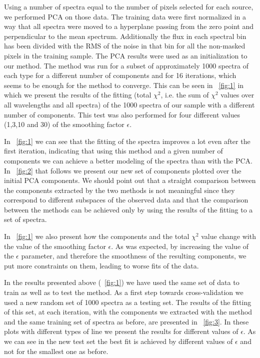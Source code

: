 \documentclass[12pt,preprint]{aastex}
\begin{document}
Using a number of spectra equal to the number of pixels selected for
each source, we performed PCA on those data. The training data were
first normalized in a way that all spectra were moved to a hyperplane
passing from the zero point and perpendicular to the mean
spectrum. Additionally the flux in each spectral bin has been divided
with the RMS of the noise in that bin for all the non-masked pixels in
the training sample. The PCA results were used as an initialization to
our method. The method was run for a subset of approximately 1000
spectra of each type for a different number of components and for 16
iterations, which seems to be enough for the method to converge. This
can be seen in \figurename~\ref{fig:1} in which we present the results of
the fitting (total $\chi^2$, i.e. the sum of $\chi^2$ values over all
wavelengths and all spectra) of the 1000 spectra of our sample with a
different number of components. This test was also performed for four
different values (1,3,10 and 30) of the smoothing factor $\epsilon$.

In \figurename~\ref{fig:1} we can see that the fitting of the spectra
improves a lot even after the first iteration, indicating that using
this method and a given number of components we can achieve a better
modeling of the spectra than with the PCA. In \figurename~\ref{fig:2}
that follows we present our new set of components plotted over the
initial PCA components. We should point out that a straight comparison
between the components extracted by the two methods is not meaningful
since they correspond to different subspaces of the observed data and
that the comparison between the methods can be achieved only by using
the results of the fitting to a set of spectra.

In \figurename~\ref{fig:1} we also present how the components and the
total $\chi^2$ value change with the value of the smoothing factor
$\epsilon$. As was expected, by increasing the value of the $\epsilon$
parameter, and therefore the smoothness of the resulting components,
we put more constraints on them, leading to worse fits of the data.

In the results presented above (\figurename~\ref{fig:1}) we have used
the same set of data to train as well as to test the method. As a
first step towards cross-validation we used a new random set of 1000
spectra as a testing set. The results of the fitting of this set, at
each iteration, with the components we extracted with the method and
the same training set of spectra as before, are presented in
\figurename~\ref{fig:3}. In these plots with different types of line
we present the results for different values of $\epsilon$. As we can
see in the new test set the best fit is achieved by different values
of $\epsilon$ and not for the smallest one as before.
\end{document}
